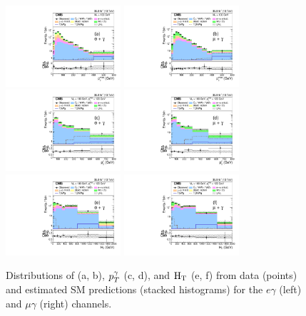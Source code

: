 \documentclass[thesis.tex]{subfiles}
\renewcommand\_{\textunderscore\allowbreak}
\begin{document}
\begin{figure}[tb]
\centering
\includegraphics[width=0.38\textwidth]{Fig/Figure_004-a.pdf}
\includegraphics[width=0.38\textwidth]{Fig/Figure_004-b.pdf} \\
\includegraphics[width=0.38\textwidth]{Fig/Figure_004-c.pdf}
\includegraphics[width=0.38\textwidth]{Fig/Figure_004-d.pdf} \\
\includegraphics[width=0.38\textwidth]{Fig/Figure_004-e.pdf}
\includegraphics[width=0.38\textwidth]{Fig/Figure_004-f.pdf}
\caption{Distributions of \MET (a, b), $p_T^{\mathrm{\gamma}}$ (c, d), and $\textrm{H}_\textrm{T}$
  (e, f) from data (points) and estimated SM predictions (stacked
  histograms) for the $e\gamma$ (left) and $\mu\gamma$ (right)
  channels.}
\label{fig:signalPhoPt} 
\end{figure}
\end{document}
